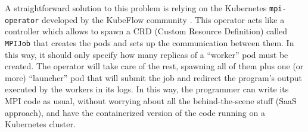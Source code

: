 A straightforward solution to this problem is relying on the Kubernetes
\texttt{mpi-operator} developed by the KubeFlow community
\cite{kubeflow-mpioperator}.
This operator acts like a controller which allows to spawn a CRD (Custom
Resource Definition) called \texttt{MPIJob} \cite{redhat-mpioperator} that
creates the pods and sets up the communication between them.
In this way, it should only specify how many replicas of a ``worker'' pod must
be created. The operator will take care of the rest, spawning all of them plus
one (or more) ``launcher'' pod that will submit the job and redirect the
program's output executed by the workers in its logs.
In this way, the programmer can write its MPI code as usual, without worrying
about all the behind-the-scene stuff (SaaS approach), and have the containerized
version of the code running on a Kubernetes cluster.

